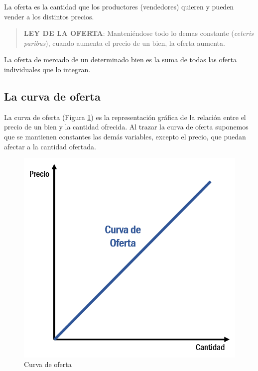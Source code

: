 \documentclass[
]{krantz}
\begin{document}
La oferta es la cantidad que los productores (vendedores) quieren y pueden vender a los distintos precios.

\begin{quote}
\textbf{LEY DE LA OFERTA}:
Manteniéndose todo lo demas constante (\emph{ceteris paribus}), cuando aumenta el precio de un bien, la oferta aumenta.
\end{quote}

La oferta de mercado de un determinado bien es la suma de todas las oferta individuales que lo integran.

\hypertarget{la-curva-de-oferta}{%
\subsection{La curva de oferta}\label{la-curva-de-oferta}}

La curva de oferta (Figura \ref{fig:12a-03}) es la representación gráfica de la relación entre el precio de un bien y la cantidad ofrecida. Al trazar la curva de oferta suponemos que se mantienen constantes las demás variables, excepto el precio, que puedan afectar a la cantidad ofertada.

\begin{figure}
\centering
\includegraphics{images/12a-03.png}
\caption{\label{fig:12a-03}Curva de oferta}
\end{figure}
\end{document}
